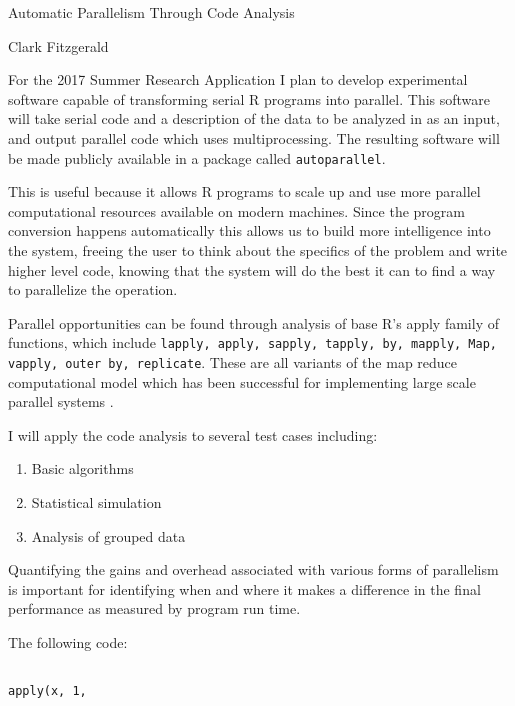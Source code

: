 \documentclass[12pt]{article}
\begin{document}
\begin{center}
    \large Automatic Parallelism Through Code Analysis 

    \normalsize Clark Fitzgerald
\end{center}

\vspace{3\baselineskip}

For the 2017 Summer Research Application I plan to develop experimental software capable
of transforming serial R programs into parallel. This software will take
serial code and a description of the data to be analyzed in as an input,
and output parallel code which uses multiprocessing. The resulting software
will be made publicly available in a package called \texttt{autoparallel}.

This is useful because it allows R programs to scale up and use more
parallel computational resources available on modern machines. Since the
program conversion happens automatically this allows us to build more
intelligence into the system, freeing the user to think about the specifics
of the problem and write higher level code, knowing that the system will do
the best it can to find a way to parallelize the operation.

Parallel opportunities can be found through analysis of base R's apply family of functions,
which include \texttt{lapply, apply, sapply, tapply, by, mapply, Map, vapply, outer
by, replicate}. These are all variants of the map reduce computational model which
has been successful for implementing large scale parallel systems
\cite{dean2008mapreduce}.

I will apply the code analysis to several test cases including:
\begin{enumerate}
    \item Basic algorithms
    \item Statistical simulation
    \item Analysis of grouped data
\end{enumerate}

Quantifying the gains and overhead associated with various forms of
parallelism is important for identifying when and where it makes a
difference in the final performance as measured by program run time.

The following code:

\begin{verbatim}

apply(x, 1, 

\end{verbatim}


 
\end{document}
